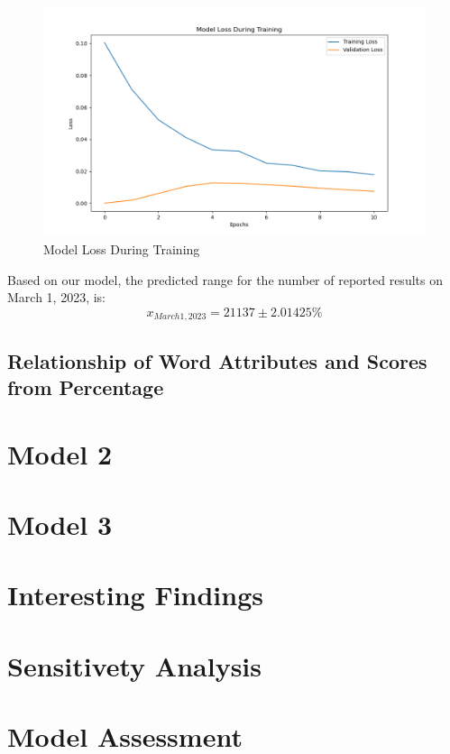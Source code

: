 \documentclass{mcmthesis}  %
\begin{document}
\begin{figure}[h]  %
        \small
        \centering  %
        \includegraphics[width=12cm]{figure/F4.png}  %
        \caption{Model Loss During Training} \label{Figure4}  %
\end{figure}  %

Based on our model, the predicted range for the number of reported results on March 1, 2023, is:
\begin{equation}  %
        x_{March1,2023} =21137\pm 2.01425\%
        \end{equation}  %
\subsection{Relationship of Word Attributes and Scores from Percentage}

\section{Model 2}  %

\section{Model 3}  %

\section{Interesting Findings}  %

\section{Sensitivety Analysis}  %

\section{Model Assessment}
\end{document}
